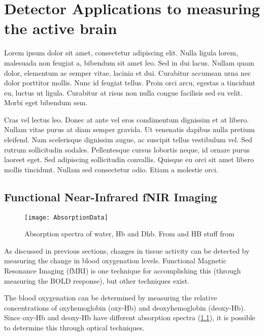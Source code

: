 \chapter{Detector Applications to measuring the active brain}
Lorem ipsum dolor sit amet, consectetur adipiscing elit. Nulla ligula lorem, malesuada non feugiat a, bibendum sit amet leo. Sed in dui lacus. Nullam quam dolor, elementum ac semper vitae, lacinia et dui. Curabitur accumsan urna nec dolor porttitor mollis. Nunc id feugiat tellus. Proin orci arcu, egestas a tincidunt eu, luctus ut ligula. Curabitur at risus non nulla congue facilisis sed eu velit. Morbi eget bibendum sem.

Cras vel lectus leo. Donec at ante vel eros condimentum dignissim et at libero. Nullam vitae purus at diam semper gravida. Ut venenatis dapibus nulla pretium eleifend. Nam scelerisque dignissim augue, ac suscipit tellus vestibulum vel. Sed rutrum sollicitudin sodales. Pellentesque cursus lobortis neque, id ornare purus laoreet eget. Sed adipiscing sollicitudin convallis. Quisque eu orci sit amet libero mollis tincidunt. Nullam sed consectetur odio. Etiam a molestie orci.

\section{{F}unctional {N}ear-{I}nfrared {fNIR} Imaging}
\begin{figure}[b]
  \begin{center}
    \texttt{[image: AbsorptionData]}
    \caption[Absorption spectra of water, deoxyhemoglobin and oxyhemoblogin]{\label{fig:fnirabsorption} Absorption spectra of water, Hb and Dhb.  From \citet{cope} and HB stuff from \citet{horecker} }
  \end{center}
\end{figure}

As discussed in previous sections, changes in tissue activity can be detected by measuring the change in blood oxygenation levels.  Functional Magnetic Resonance Imaging (fMRI) is one technique for accomplishing this (through measuring the BOLD response), but other techniques exist.  

The blood oxygenation can be determined by measuring the relative concentrations of oxyhemoglobin (oxy-Hb) and deoxyhemoglobin (deoxy-Hb).  Since oxy-Hb and deoxy-Hb have different absorption spectra (\cref{fig:fnirabsorption}), it is possible to determine this through optical techniques.

